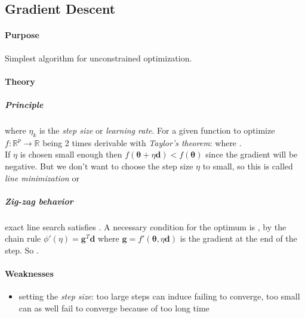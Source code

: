 \subsection{Gradient Descent}
\paragraph{Purpose}
Simplest algorithm for unconstrained optimization.
\paragraph{Theory}
\subparagraph{Principle}
\begin{center}
\end{center}
where $\eta_{k}$ is the \emph{step size} or \emph{learning rate}.
For a given  function to optimize $f: \mathbb{R}^{p}\longrightarrow\mathbb{R}$ being 2 times 
derivable  with \emph{Taylor's theorem}:  where .\\
If $\eta$ is chosen small enough then $f(\bm{\theta}+\eta\bm{d})<f(\bm{\theta})$ since the gradient
will be negative. But we don't want to choose the step size $\eta$ to small, so  this is called \emph{line 
minimization} or 
\subparagraph{Zig-zag behavior} exact line search satisfies . A necessary condition for the optimum is , by the chain rule 
$\phi'(\eta) = \bm{g}^{T}\bm{d}$ where $\bm{g} = f'(\bm{\theta}, \eta\bm{d})$ is the gradient at the
end of the step. So .


\paragraph{Weaknesses}
\begin{itemize}
    \item setting the \emph{step size}: too large steps can induce failing to converge, too small
        can as well fail to converge because of too long time
\end{itemize}

